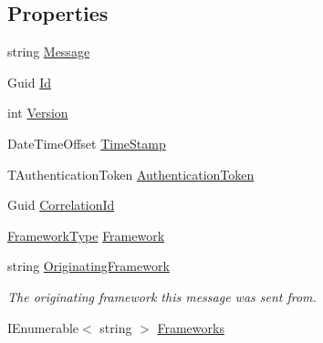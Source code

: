 \subsection*{Properties}
\begin{DoxyCompactItemize}
\item 
string \hyperlink{classCqrs_1_1EventStore_1_1SimpleEvent_a4e07144de1cdb94bbbf1313eb0e1f35d}{Message}
\item 
Guid \hyperlink{classCqrs_1_1EventStore_1_1SimpleEvent_a7baf42c52ddbd269ae3739ddd7a777a4}{Id}
\item 
int \hyperlink{classCqrs_1_1EventStore_1_1SimpleEvent_a9c67d7a71f357201db7801cd9122415e}{Version}
\item 
Date\+Time\+Offset \hyperlink{classCqrs_1_1EventStore_1_1SimpleEvent_a47ab7f023f640dbfe6a1f1395a94b147}{Time\+Stamp}
\item 
T\+Authentication\+Token \hyperlink{classCqrs_1_1EventStore_1_1SimpleEvent_a91ca9d263c41a4b5ffc30f9245aa6fe9}{Authentication\+Token}
\item 
Guid \hyperlink{classCqrs_1_1EventStore_1_1SimpleEvent_aa96b900b0fef8e6b2f6af81b5ce99f16}{Correlation\+Id}
\item 
\hyperlink{namespaceCqrs_1_1Messages_af06a7e6cd2609043d0f2f5f3419f81e3}{Framework\+Type} \hyperlink{classCqrs_1_1EventStore_1_1SimpleEvent_aaf8a01038e32c3f0c0edd53fbad3658c}{Framework}
\item 
string \hyperlink{classCqrs_1_1EventStore_1_1SimpleEvent_a3b365c5f9a7ee4491e01a463dca178b7}{Originating\+Framework}
\begin{DoxyCompactList}\small\item\em The originating framework this message was sent from. \end{DoxyCompactList}\item 
I\+Enumerable$<$ string $>$ \hyperlink{classCqrs_1_1EventStore_1_1SimpleEvent_ac9f0b878d05f7a3fde9560ae9477c9ec}{Frameworks}

\end{DoxyCompactItemize}
